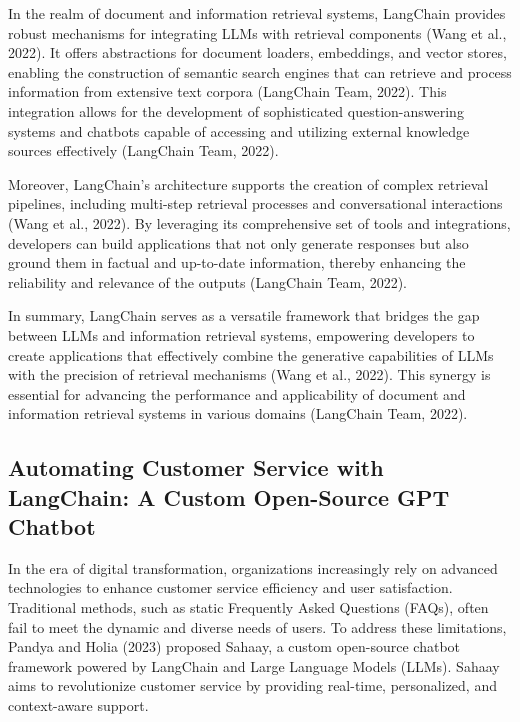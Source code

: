 In the realm of document and information retrieval systems, LangChain provides robust mechanisms for integrating LLMs with retrieval components (Wang et al., 2022). It offers abstractions for document loaders, embeddings, and vector stores, enabling the construction of semantic search engines that can retrieve and process information from extensive text corpora (LangChain Team, 2022). This integration allows for the development of sophisticated question-answering systems and chatbots capable of accessing and utilizing external knowledge sources effectively (LangChain Team, 2022).

Moreover, LangChain's architecture supports the creation of complex retrieval pipelines, including multi-step retrieval processes and conversational interactions (Wang et al., 2022). By leveraging its comprehensive set of tools and integrations, developers can build applications that not only generate responses but also ground them in factual and up-to-date information, thereby enhancing the reliability and relevance of the outputs (LangChain Team, 2022).

In summary, LangChain serves as a versatile framework that bridges the gap between LLMs and information retrieval systems, empowering developers to create applications that effectively combine the generative capabilities of LLMs with the precision of retrieval mechanisms (Wang et al., 2022). This synergy is essential for advancing the performance and applicability of document and information retrieval systems in various domains (LangChain Team, 2022).


\subsection{Automating Customer Service with LangChain: A Custom Open-Source GPT Chatbot}

\noindent In the era of digital transformation, organizations increasingly rely on advanced technologies to enhance customer service efficiency and user satisfaction. Traditional methods, such as static Frequently Asked Questions (FAQs), often fail to meet the dynamic and diverse needs of users. To address these limitations, Pandya and Holia (2023) proposed Sahaay, a custom open-source chatbot framework powered by LangChain and Large Language Models (LLMs). Sahaay aims to revolutionize customer service by providing real-time, personalized, and context-aware support.

